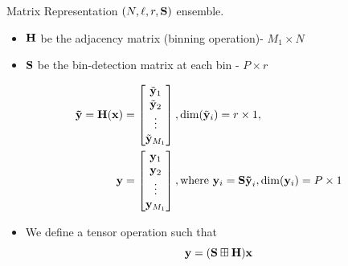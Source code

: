 \documentclass[10pt]{beamer}
\begin{document}
\begin{frame}{Matrix Representation}
$(N,\ell,r,\mathbf{S})$ ensemble. 
\begin{itemize}
\item $\mathbf{H}$ be the adjacency matrix (binning operation)- $M_1 \times N$
\item $\mathbf{S}$ be the bin-detection matrix at each bin - $P \times r$
\end{itemize}
\begin{align*}
\mbf{\tilde{y}=H(x)}&= 
\begin{bmatrix}
   \tilde{\mbf{ y}}_{1} \\
   \tilde{ \mbf{y}}_{2} \\
    \vdots \\
   \tilde{\mbf{y}}_{M_1}
\end{bmatrix}
,\text{dim}(\tilde{\mbf{y}}_{i} )=r \times 1,
\\
\vspace{10pt}
\mbf{y}&= 
\begin{bmatrix}
   \mbf{ y}_{1}\\
    \mbf{y}_{2}  \\
    \vdots \\
    \mbf{y}_{M_1}
\end{bmatrix}
, \text{where } \mbf{y}_i= \mbf{S \tilde{y}}_{i}, \text{dim} (\mbf{y}_i)=P \times 1   
\end{align*}
\begin{itemize}
\item We define a tensor operation such that 
\begin{equation*}
\mathbf{y=(S\boxplus H)  x}
\end{equation*}
\end{itemize}
\end{frame}
\end{document}
